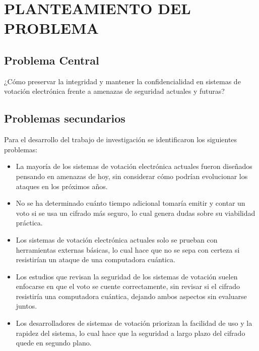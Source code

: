 \section{PLANTEAMIENTO DEL PROBLEMA}
\subsection{Problema Central}
¿Cómo preservar la integridad y mantener la confidencialidad en sistemas de votación electrónica frente a amenazas de seguridad actuales y futuras?




\subsection{Problemas secundarios}
Para el desarrollo del trabajo de investigación se identificaron los siguientes problemas:

\begin{itemize}
	
	
	\item La mayoría de los sistemas de votación electrónica actuales fueron diseñados pensando en amenazas de hoy, sin considerar cómo podrían evolucionar los ataques en los próximos años.

	
	\item No se ha determinado cuánto tiempo adicional tomaría emitir y contar un voto si se usa un cifrado más seguro, lo cual genera dudas sobre su viabilidad práctica.
	
		\item Los sistemas de votación electrónica actuales solo se prueban con herramientas externas básicas, lo cual hace que no se sepa con certeza si resistirían un ataque de una computadora cuántica.
	
	
		\item Los estudios que revisan la seguridad de los sistemas de votación suelen enfocarse en que el voto se cuente correctamente, sin revisar si el cifrado resistiría una computadora cuántica, dejando ambos aspectos sin evaluarse juntos.
	
	
		\item Los desarrolladores de sistemas de votación priorizan la facilidad de uso y la rapidez del sistema, lo cual hace que la seguridad a largo plazo del cifrado quede en segundo plano.
	

\end{itemize}